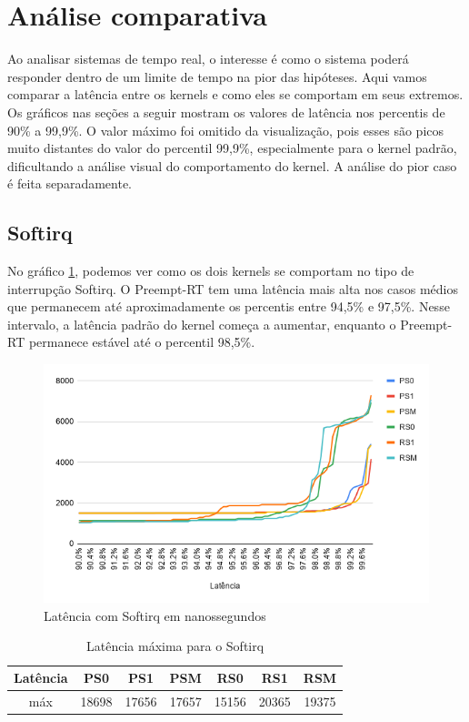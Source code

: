 \section{Análise comparativa}

Ao analisar sistemas de tempo real, o interesse é como o sistema poderá responder dentro de um limite de tempo na pior das hipóteses. Aqui vamos comparar a latência entre os kernels e como eles se comportam em seus extremos. Os gráficos nas seções a seguir mostram os valores de latência nos percentis de 90\% a 99,9\%. O valor máximo foi omitido da visualização, pois esses são picos muito distantes do valor do percentil 99,9\%, especialmente para o kernel padrão, dificultando a análise visual do comportamento do kernel. A análise do pior caso é feita separadamente.

\subsection{Softirq}

No gráfico \ref{grafico:softirq}, podemos ver como os dois kernels se comportam no tipo de interrupção Softirq. O Preempt-RT tem uma latência mais alta nos casos médios que permanecem até aproximadamente os percentis entre 94,5\% e 97,5\%. Nesse intervalo, a latência padrão do kernel começa a aumentar, enquanto o Preempt-RT permanece estável até o percentil 98,5\%.

\begin{figure}[!p]
    \centering
    \includegraphics[width=\textwidth]{graficos/softirq.png}
    \caption{Latência com Softirq em nanossegundos}
    \label{grafico:softirq}
\end{figure}

\begin{table}[!p]
    \centering
    \begin{center}
        \begin{tabular}{|c|c|c|c|c|c|c|}
            \toprule
                Latência & PS0 &    PS1 &    PSM &    RS0 &     RS1 &    RSM \\
            \midrule
                máx & 18698 &  17656 &  17657 & 15156 &  20365 &  19375 \\
            \bottomrule
        \end{tabular}
    \end{center}
    \caption{Latência máxima para o Softirq}
    \label{table:max-softirq}
\end{table}

